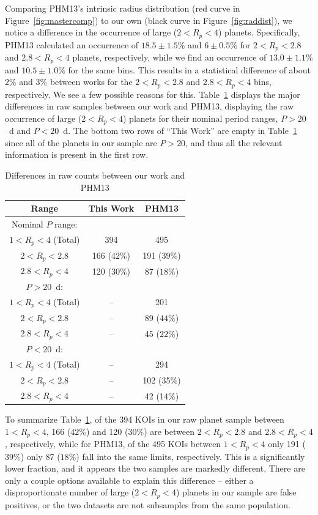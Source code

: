 Comparing PHM13's intrinsic radius distribution 
(red curve in Figure~\ref{fig:mastercomp}) to our own (black curve in Figure~\ref{fig:raddist}), 
we notice a difference in the occurrence of large ($2<R_p<4$) planets.
Specifically, PHM13 calculated an occurrence of $18.5 \pm 1.5\%$ and $6 \pm 0.5\%$ 
for $2<R_p<2.8$ and $2.8<R_p<4$ planets, respectively, while we find
an occurrence of $13.0 \pm 1.1\%$ and $10.5 \pm 1.0\%$ for the same bins. This results in a statistical 
difference of about $2\%$ and $3\%$ between works for the $2<R_p<2.8$ 
and $2.8<R_p<4$ bins, respectively. 
We see a few possible reasons for this. Table~\ref{tab:comp} displays the major differences 
in raw samples between our work and PHM13, displaying the raw occurrence of large 
($2<R_p<4$\rearth{})
planets for their nominal period ranges, $P>20$~d and $P<20$~d. The bottom two rows of
``This Work'' are empty in Table~\ref{tab:comp} since all of the planets in our sample are $P>20$, 
and thus all the relevant information is present in the first row.  
\begin{table}[h]
\centering
\caption{Differences in raw counts between our work and PHM13}
\begin{tabular}{|c|cc|}\hline Range & This Work & PHM13 \\\hline 
Nominal $P$ range: & & \\
$1<R_p<4$\rearth{} (Total) & 394 & 495 \\
$2<R_p<2.8$\rearth{} & 166 ($42 \%$) & 191 ($39 \%$) \\
$2.8<R_p<4$\rearth{} & 120 ($30 \%$) & 87 ($18 \%$) \\\hline
$P>20$~d: & & \\
$1<R_p<4$\rearth{} (Total) & -- & 201 \\
$2<R_p<2.8$\rearth{} & -- & 89 ($44 \%$) \\
$2.8<R_p<4$\rearth{} & -- & 45 ($22 \%$) \\\hline
$P<20$~d: & & \\
$1<R_p<4$\rearth{} (Total) & -- & 294 \\
$2<R_p<2.8$\rearth{} & -- & 102 (35$\%$)\\
$2.8<R_p<4$\rearth{} & -- & 42 (14$\%$) \\\hline
\end{tabular}
\label{tab:comp}
\end{table}

To summarize Table~\ref{tab:comp}, of the 394
KOIs in our raw planet sample between $1<R_p<4$, 166 ($42 \%$) and 120 ($30 \%$) 
are between $2<R_p<2.8$\rearth{} and $2.8<R_p<4$\rearth{}, respectively, 
while for PHM13, of the 495 KOIs between $1<R_p<4$\rearth{}
only 191 ($39 \%$) only 87 ($18 \%$) fall into the same limits, respectively. 
This is a significantly lower fraction, and it appears the two samples 
are markedly different. There are only a couple options available to explain this difference -- 
either a disproportionate number of large 
($2<R_p<4$\rearth{}) planets in our sample are false positives, 
or the two datasets are not subsamples from the same population. 

